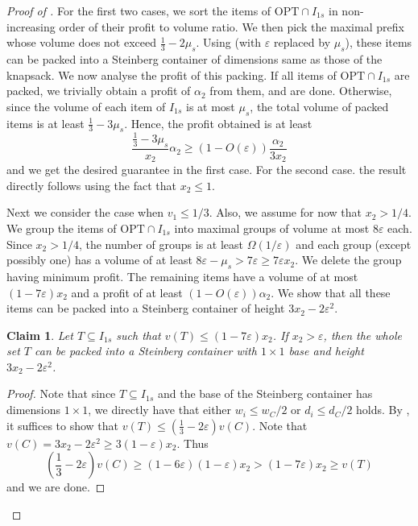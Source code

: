 \documentclass[10pt,a4paper]{amsart}
\renewcommand{\epsilon}{\varepsilon} %
\newtheorem{claim}[theorem]{Claim}
\theoremstyle{definition}
\begin{document}
\iffalse
\begin{proof}[Proof of ]
    For the first two cases, we sort the items of $\text{OPT}\cap I_{1s}$ in non-increasing order of their profit to volume ratio. We then pick the maximal prefix whose volume does not exceed $\frac{1}{3}-2\mu_s$. Using  (with $\epsilon$ replaced by $\mu_s$), these items can be packed into a Steinberg container of dimensions same as those of the knapsack. We now analyse the profit of this packing. If all items of $\text{OPT}\cap I_{1s}$ are packed, we trivially obtain a profit of $\alpha_2$ from them, and are done. Otherwise, since the volume of each item of $I_{1s}$ is at most $\mu_s$, the total volume of packed items is at least $\frac{1}{3}-3\mu_s$. Hence, the profit obtained is at least 
    \[ \frac{\frac{1}{3}-3\mu_s}{x_2}\alpha_2 \ge (1-O(\epsilon))\frac{\alpha_2}{3x_2}\]
    and we get the desired guarantee in the first case. For the second case. the result directly follows using the fact that $x_2 \le 1$.
    
    
    Next we consider the case when $v_1\le 1/3$. Also, we assume for now that $x_2 > 1/4$. We group the items of $\text{OPT}\cap I_{1s}$ into maximal groups of volume at most $8\epsilon$ each. Since $x_2 > 1/4$, the number of groups is at least $\Omega(1/\epsilon)$ and each group (except possibly one) has a volume of at least $8\epsilon-\mu_s>7\epsilon\ge 7\epsilon x_2$. We delete the group having minimum profit. The remaining items have a volume of at most $(1-7\epsilon)x_2$ and a profit of at least $(1-O(\epsilon))\alpha_2$. We show that all these items can be packed into a Steinberg container of height $3x_2-2\epsilon^2$.
    
    \begin{claim}
        Let $T\subseteq I_{1s}$ such that $v(T)\le (1-7\epsilon)x_2$. If $x_2 > \epsilon$, then the whole set $T$ can be packed into a Steinberg container with $1\times 1$ base and height $3x_2-2\epsilon^2$.
    \end{claim}
    \begin{proof}
        Note that since $T\subseteq I_{1s}$ and the base of the Steinberg container has dimensions $1\times 1$, we directly have that either $w_i \le w_C/2$ or $d_i \le d_C/2$ holds. By , it suffices to show that $v(T)\le \left(\frac{1}{3}-2\epsilon\right)v(C)$. Note that $v(C) = 3x_2 - 2\epsilon^2 \ge 3(1-\epsilon)x_2$. Thus
        \[ \left(\frac{1}{3}-2\epsilon\right)v(C) \ge (1-6\epsilon)(1-\epsilon)x_2 > (1-7\epsilon)x_2 \ge v(T)\]
        and we are done.
    \end{proof}


\end{proof}
\end{document}
